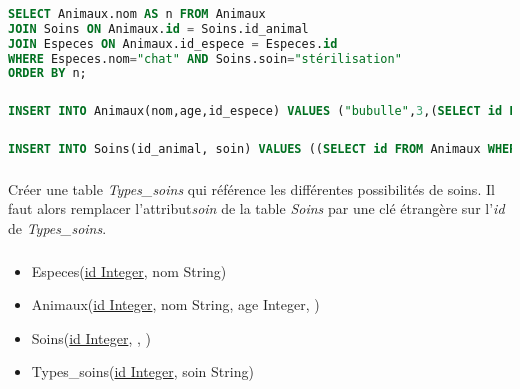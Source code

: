 \documentclass[svgnames,11pt]{beamer}
\begin{document}
\begin{frame}[fragile]
    \frametitle{}

\begin{center}
\begin{lstlisting}[language=SQL , basicstyle=\ttfamily\small, xleftmargin=.5em, xrightmargin=0em]
SELECT Animaux.nom AS n FROM Animaux
JOIN Soins ON Animaux.id = Soins.id_animal
JOIN Especes ON Animaux.id_espece = Especes.id
WHERE Especes.nom="chat" AND Soins.soin="stérilisation"
ORDER BY n;
\end{lstlisting}
\label{CODE}
\end{center}

\end{frame}
\begin{frame}[fragile]
    \frametitle{}

\begin{center}
\begin{lstlisting}[language=SQL , basicstyle=\ttfamily\small, xleftmargin=.5em, xrightmargin=0em]
INSERT INTO Animaux(nom,age,id_espece) VALUES ("bubulle",3,(SELECT id FROM Especes WHERE nom="poisson")); 
\end{lstlisting}
\label{CODE}
\end{center}

\end{frame}
\begin{frame}[fragile]
    \frametitle{}

\begin{center}
\begin{lstlisting}[language=SQL , basicstyle=\ttfamily\small, xleftmargin=.5em, xrightmargin=0em]
INSERT INTO Soins(id_animal, soin) VALUES ((SELECT id FROM Animaux WHERE nom="cartman"),"stérilisation");
\end{lstlisting}
\label{CODE}
\end{center}

\end{frame}
\begin{frame}
    \frametitle{}

Créer une table \emph{Types\_soins} qui référence les différentes possibilités de soins. Il faut alors remplacer l'attribut\emph{soin} de la table \emph{Soins} par une clé étrangère sur l'\emph{id} de \emph{Types\_soins}.

\end{frame}
\begin{frame}
    \frametitle{}

    
\begin{itemize}
    \item Especes(\underline{id Integer}, nom String)
    \item Animaux(\underline{id Integer}, nom String, age Integer, )
    \item Soins(\underline{id Integer}, , )
    \item Types\_soins(\underline{id Integer}, soin String)
    \end{itemize}

\end{frame}
\end{document}
